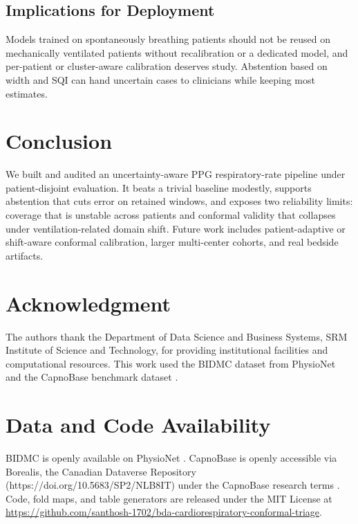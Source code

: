 \documentclass[conference]{IEEEtran}
\begin{document}
\subsection{Implications for Deployment}
Models trained on spontaneously breathing patients should not be reused on mechanically ventilated patients without recalibration or a dedicated model, and per-patient or cluster-aware calibration deserves study. Abstention based on width and SQI can hand uncertain cases to clinicians while keeping most estimates.

\section{Conclusion}\label{sec:conclusion}
We built and audited an uncertainty-aware PPG respiratory-rate pipeline under patient-disjoint evaluation. It beats a trivial baseline modestly, supports abstention that cuts error on retained windows, and exposes two reliability limits: coverage that is unstable across patients and conformal validity that collapses under ventilation-related domain shift. Future work includes patient-adaptive or shift-aware conformal calibration, larger multi-center cohorts, and real bedside artifacts.

\section*{Acknowledgment}
The authors thank the Department of Data Science and Business Systems, SRM Institute of Science and Technology, for providing institutional facilities and computational resources. This work used the BIDMC dataset from PhysioNet \cite{goldberger2000} and the CapnoBase benchmark dataset \cite{karlen2013}.

\section*{Data and Code Availability}
BIDMC is openly available on PhysioNet \cite{pimentel2016,goldberger2000}. CapnoBase is openly accessible via Borealis, the Canadian Dataverse Repository (https://doi.org/10.5683/SP2/NLB8IT) under the CapnoBase research terms \cite{karlen2013}. Code, fold maps, and table generators are released under the MIT License at \url{https://github.com/santhosh-1702/bda-cardiorespiratory-conformal-triage}.



\end{document}
